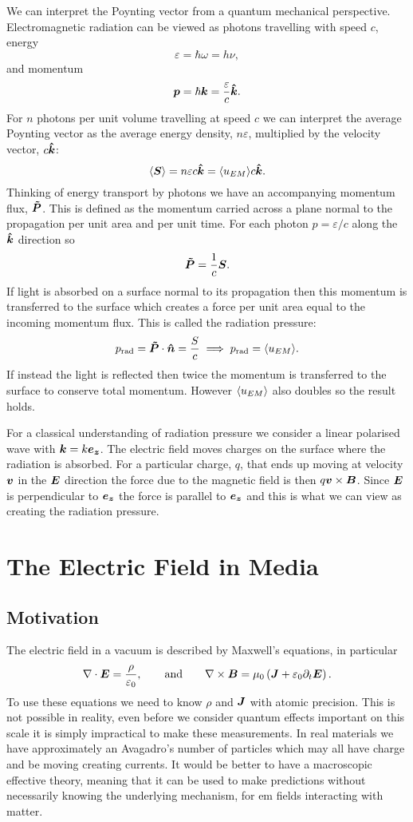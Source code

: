     We can interpret the Poynting vector from a quantum mechanical perspective.
    Electromagnetic radiation can be viewed as photons travelling with speed \(c\), energy
    \[\varepsilon = \hbar\omega = h\nu,\]
    and momentum
    \[\bm{p} = \hbar\bm{k} = \frac{\varepsilon}{c}\bm{\hat{k}}.\]
    For \(n\) photons per unit volume travelling at speed \(c\) we can interpret the average Poynting vector as the average energy density, \(n\varepsilon\), multiplied by the velocity vector, \(c\bm{\hat{k}}\):
    \[\langle{\bm{S}}\rangle = n\varepsilon c\bm{\hat{k}} = \langle{u_{EM}}\rangle c\bm{\hat{k}}.\]
    Thinking of energy transport by photons we have an accompanying momentum flux, \(\bm{\tilde{P}}\).
    This is defined as the momentum carried across a plane normal to the propagation per unit area and per unit time.
    For each photon \(p = \varepsilon/c\) along the \(\bm{\hat{k}}\) direction so
    \[\bm{\tilde{P}} = \frac{1}{c}\bm{S}.\]
    If light is absorbed on a surface normal to its propagation then this momentum is transferred to the surface which creates a force per unit area equal to the incoming momentum flux.
    This is called the radiation pressure:
    \[p_{\text{rad}} = \bm{\tilde{P}}\cdot\bm{\hat{n}} = \frac{S}{c} \implies p_{\text{rad}} = \langle{u_{EM}}\rangle.\]
    If instead the light is reflected then twice the momentum is transferred to the surface to conserve total momentum.
    However \(\langle{u_{EM}}\rangle\) also doubles so the result holds.
    
    For a classical understanding of radiation pressure we consider a linear polarised wave with \(\bm{k} = k\bm{e_{z}}\).
    The electric field moves charges on the surface where the radiation is absorbed.
    For a particular charge, \(q\), that ends up moving at velocity \(\bm{v}\) in the \(\bm{E}\) direction the force due to the magnetic field is then \(q\bm{v}\times\bm{B}\).
    Since \(\bm{E}\) is perpendicular to \(\bm{e_{z}}\) the force is parallel to \(\bm{e_{z}}\) and this is what we can view as creating the radiation pressure.
    
    \section{The Electric Field in Media}
    \subsection{Motivation}
    The electric field in a vacuum is described by Maxwell's equations, in particular
    \[\nabla\cdot\bm{E} = \frac{\rho}{\varepsilon_0}, \qquad\text{and}\qquad \nabla\times\bm{B} = \mu_0\left(\bm{J} + \varepsilon_0\partial_t\bm{E}\right).\]
    To use these equations we need to know \(\rho\) and \(\bm{J}\) with atomic precision.
    This is not possible in reality, even before we consider quantum effects important on this scale it is simply impractical to make these measurements.
    In real materials we have approximately an Avagadro's number of particles which may all have charge and be moving creating currents.
    It would be better to have a macroscopic effective theory, meaning that it can be used to make predictions without necessarily knowing the underlying mechanism, for \gls{em} fields interacting with matter.
    

